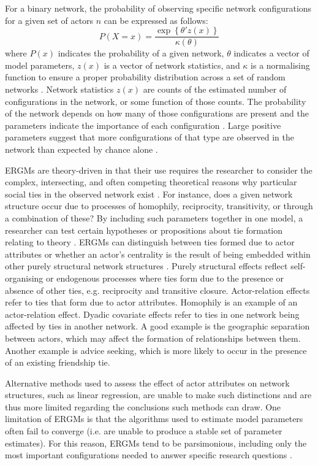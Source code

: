 For a binary network, the probability of observing specific network configurations for a given set of actors \(n\) can be expressed as follows: $$ P(X = x) = \frac{\exp \left \{ \theta'z(x)  \right \}}{\kappa (\theta )} $$ where $P(x)$ indicates the probability of a given network, $\theta$ indicates a vector of model parameters, $z(x)$ is a vector of network statistics, and $\kappa$ is a normalising function to ensure a proper probability distribution across a set of random networks \citep{shumate2010exponential}. Network statistics $z(x)$ are counts of the estimated number of configurations in the network, or some function of those counts. The probability of the network depends on how many of those configurations are present and the parameters indicate the importance of each configuration \citep{lusher2013exponential}. Large positive parameters suggest that more configurations of that type are observed in the network than expected by chance alone \citep{robins2009closure}. \medskip

ERGMs are theory-driven in that their use requires the researcher to consider the complex, intersecting, and often competing theoretical reasons why particular social ties in the observed network exist \citep{lusher2013exponential}. For instance, does a given network structure occur due to processes of homophily, reciprocity, transitivity, or through a combination of these? By including such parameters together in one model, a researcher can test certain hypotheses or propositions about tie formation relating to theory \citep{robins2007recent}. ERGMs can distinguish between ties formed due to actor attributes or whether an actor’s centrality is the result of being embedded within other purely structural network structures \citep{lusher2013exponential}. Purely structural effects reflect self-organising or endogenous processes where ties form due to the presence or absence of other ties, e.g. reciprocity and transitive closure. Actor-relation effects refer to ties that form due to actor attributes. Homophily is an example of an actor-relation effect. Dyadic covariate effects refer to ties in one network being affected by ties in another network. A good example is the geographic separation between actors, which may affect the formation of relationships between them. Another example is advice seeking, which is more likely to occur in the presence of an existing friendship tie. \medskip

Alternative methods used to assess the effect of actor attributes on network structures, such as linear regression, are unable to make such distinctions and are thus more limited regarding the conclusions such methods can draw. One limitation of ERGMs is that the algorithms used to estimate model parameters often fail to converge (i.e. are unable to produce a stable set of parameter estimates). For this reason, ERGMs tend to be parsimonious, including only the most important configurations needed to answer specific research questions \citep{mcallister2017balancing,silk2017application}. 

